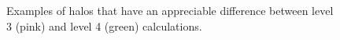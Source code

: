 \begin{figure}[!ht]
  \centering
  \hfill%
  \caption{Examples of halos that have an appreciable difference between level 3 (pink) and level 4 (green) calculations. }
  \label{fig:badConvergence}
\end{figure}


